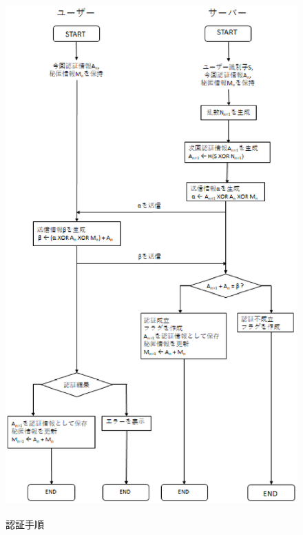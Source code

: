 \begin{figure}[H]
\begin{center}
	\includegraphics[height=200mm]{sas_l2.eps}
	\caption{認証手順}
\label{fig:sas-l2_ninsyo}
\end{center}
\end{figure}

